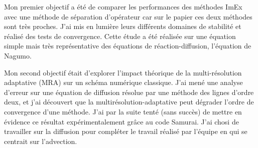 Mon premier objectif a été de comparer les performances des méthodes ImEx avec une méthode de séparation d'opérateur car sur le papier ces deux méthodes sont très proches.
J'ai mis en lumière leurs différents domaines de stabilité et réalisé des tests de convergence. Cette étude a été réalisée sur une équation simple mais très représentative des équations de réaction-diffusion,
l'équation de Nagumo.\par%
Mon second objectif était d'explorer l'impact théorique de la multi-résolution adaptative (MRA) sur un schéma numérique classique.
J'ai mené une analyse d'erreur sur une équation de diffusion résolue par une méthode des lignes d'ordre deux, et j'ai découvert %
que la multirésolution-adaptative peut dégrader l'ordre de convergence d'une méthode. J'ai par la suite tenté (sans succès) de mettre en 
évidence ce résultat expérimentalement grâce au code Samurai. J'ai chosi de travailler sur la diffusion pour compléter le travail 
réalisé par l'équipe en \cite{belloti_et_al_2025} qui se centrait sur l'advection.